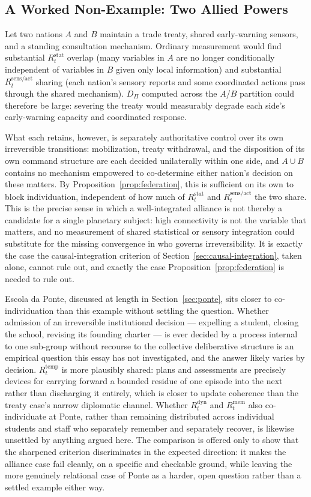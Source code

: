 \documentclass[11pt]{article}
\begin{document}
\subsection{A Worked Non-Example: Two Allied Powers}

Let two nations $A$ and $B$ maintain a trade treaty, shared early-warning sensors, and a standing consultation mechanism. Ordinary measurement would find substantial $R^{\mathrm{stat}}_t$ overlap (many variables in $A$ are no longer conditionally independent of variables in $B$ given only local information) and substantial $R^{\mathrm{sens/act}}_t$ sharing (each nation's sensory reports and some coordinated actions pass through the shared mechanism). $D_\Pi$ computed across the $A$/$B$ partition could therefore be large: severing the treaty would measurably degrade each side's early-warning capacity and coordinated response.

What each retains, however, is separately authoritative control over its own irreversible transitions: mobilization, treaty withdrawal, and the disposition of its own command structure are each decided unilaterally within one side, and $A\cup B$ contains no mechanism empowered to co-determine either nation's decision on these matters. By Proposition~\ref{prop:federation}, this is sufficient on its own to block individuation, independent of how much of $R^{\mathrm{stat}}_t$ and $R^{\mathrm{sens/act}}_t$ the two share. This is the precise sense in which a well-integrated alliance is not thereby a candidate for a single planetary subject: high connectivity is not the variable that matters, and no measurement of shared statistical or sensory integration could substitute for the missing convergence in who governs irreversibility. It is exactly the case the causal-integration criterion of Section~\ref{sec:causal-integration}, taken alone, cannot rule out, and exactly the case Proposition~\ref{prop:federation} is needed to rule out.

Escola da Ponte, discussed at length in Section~\ref{sec:ponte}, sits closer to co-individuation than this example without settling the question. Whether admission of an irreversible institutional decision --- expelling a student, closing the school, revising its founding charter --- is ever decided by a process internal to one sub-group without recourse to the collective deliberative structure is an empirical question this essay has not investigated, and the answer likely varies by decision. $R^{\mathrm{temp}}_t$ is more plausibly shared: plans and assessments are precisely devices for carrying forward a bounded residue of one episode into the next rather than discharging it entirely, which is closer to update coherence than the treaty case's narrow diplomatic channel. Whether $R^{\mathrm{dyn}}_t$ and $R^{\mathrm{mem}}_t$ also co-individuate at Ponte, rather than remaining distributed across individual students and staff who separately remember and separately recover, is likewise unsettled by anything argued here. The comparison is offered only to show that the sharpened criterion discriminates in the expected direction: it makes the alliance case fail cleanly, on a specific and checkable ground, while leaving the more genuinely relational case of Ponte as a harder, open question rather than a settled example either way.
\end{document}
